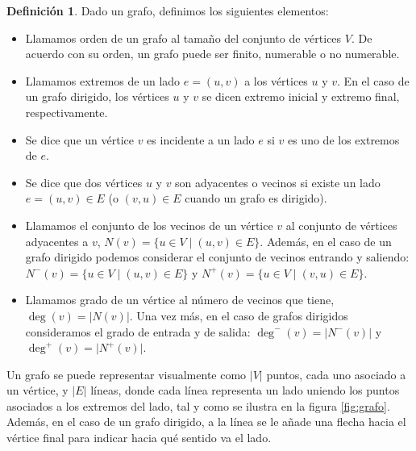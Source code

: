 \documentclass[a4paper,12pt]{report}
\theoremstyle{definition}
\newtheorem{dfn}{Definición}
\begin{document}
\begin{dfn}
  Dado un grafo, definimos los siguientes elementos:
  \begin{itemize}
  \item Llamamos orden de un grafo al tamaño del conjunto de vértices $V$. De acuerdo con su orden, un grafo puede ser finito, numerable o no numerable.
  \item Llamamos extremos de un lado $e = (u,v)$ a los vértices $u$ y $v$. En el caso de un grafo dirigido, los vértices $u$ y $v$ se dicen extremo inicial y extremo final, respectivamente.
  \item Se dice que un vértice $v$ es incidente a un lado $e$ si $v$ es uno de los extremos de $e$.
  \item Se dice que dos vértices $u$ y $v$ son adyacentes o vecinos si existe un lado $e = (u,v) \in E$ (o $(v,u) \in E$ cuando un grafo es dirigido).
  \item Llamamos el conjunto de los vecinos de un vértice $v$ al conjunto de vértices adyacentes a $v$, $N(v) = \lbrace u \in V \mid (u,v) \in E \rbrace$. Además, en el caso de un grafo dirigido podemos considerar el conjunto de vecinos entrando y saliendo: $N^-(v) = \lbrace u \in V \mid (u,v) \in E \rbrace$ y $N^+(v) = \lbrace u \in V \mid (v,u) \in E \rbrace$.
  \item Llamamos grado de un vértice al número de vecinos que tiene, $\deg(v) = \lvert N(v) \rvert$. Una vez más, en el caso de grafos dirigidos consideramos el grado de entrada y de salida: $\deg^-(v) = \lvert N^-(v) \rvert$ y $\deg^+(v) = \lvert N^+(v) \rvert$.
  \end{itemize}
\end{dfn}

Un grafo se puede representar visualmente como $\lvert V \rvert$ puntos, cada uno asociado a un vértice, y $\lvert E \rvert$ líneas, donde cada línea representa un lado uniendo los puntos asociados a los extremos del lado, tal y como se ilustra en la figura \ref{fig:grafo}. Además, en el caso de un grafo dirigido, a la línea se le añade una flecha hacia el vértice final para indicar hacia qué sentido va el lado.
\end{document}
